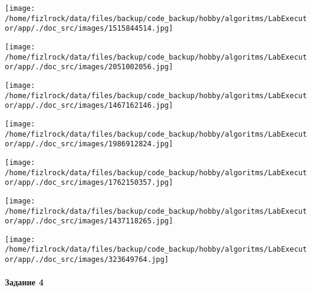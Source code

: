 \documentclass[a4paper, 12pt]{article}
\begin{document}
\texttt{[image: /home/fizlrock/data/files/backup/code\_backup/hobby/algoritms/LabExecutor/app/./doc\_src/images/1515844514.jpg]}

\texttt{[image: /home/fizlrock/data/files/backup/code\_backup/hobby/algoritms/LabExecutor/app/./doc\_src/images/2051002056.jpg]}

\texttt{[image: /home/fizlrock/data/files/backup/code\_backup/hobby/algoritms/LabExecutor/app/./doc\_src/images/1467162146.jpg]}

\texttt{[image: /home/fizlrock/data/files/backup/code\_backup/hobby/algoritms/LabExecutor/app/./doc\_src/images/1986912824.jpg]}

\texttt{[image: /home/fizlrock/data/files/backup/code\_backup/hobby/algoritms/LabExecutor/app/./doc\_src/images/1762150357.jpg]}

\texttt{[image: /home/fizlrock/data/files/backup/code\_backup/hobby/algoritms/LabExecutor/app/./doc\_src/images/1437118265.jpg]}

\texttt{[image: /home/fizlrock/data/files/backup/code\_backup/hobby/algoritms/LabExecutor/app/./doc\_src/images/323649764.jpg]}
\pagebreak
\paragraph{Задание 4}
\end{document}
